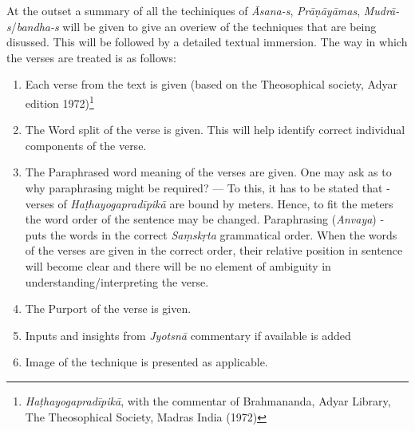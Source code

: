 At the outset a summary of all the techiniques of \textit{Āsana-s}, \textit{Prāṇāyāmas}, \textit{Mudrā-s}/\textit{bandha-s} will be given to give an overiew of the techniques that are being disussed. This will be followed by a detailed textual immersion. The way in which the verses are treated is as follows:
\begin{enumerate}
\itemsep=0pt
\item Each verse from the text is given (based on the Theosophical society, Adyar edition 1972)\footnote{\textit{Haṭhayogapradīpikā}, with the commentar of Brahmananda, Adyar Library, The Theosophical Society, Madras India (1972)}
\item The Word split of the verse is given. This will help identify correct individual components of the verse.   
\item The Paraphrased word meaning of the verses are given. One may ask as to why paraphrasing might be required? --- To this, it has to be stated that - verses of \textit{Haṭhayogapradīpikā} are bound by meters. Hence, to fit the meters the word order of the sentence may be changed. Paraphrasing (\textit{Anvaya}) -  puts the words in the correct \textit{Saṃskṛta} grammatical order. When the words of the verses are given in the correct order, their relative position in sentence will become clear and there will be no element of ambiguity in understanding/interpreting the verse.    
\item The Purport of the verse is given. 
\item Inputs and insights from \textit{Jyotsnā} commentary if available is added 
\item Image of the technique is presented as applicable.
\end{enumerate}
